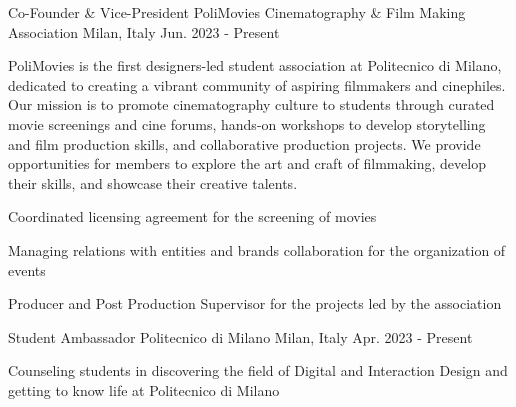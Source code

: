 

\begin{cventries}

  \cventry
    {Co-Founder \& Vice-President} %
    {PoliMovies Cinematography \& Film Making Association} %
    {Milan, Italy} %
    {Jun. 2023 - Present} %
    {
      \begin{cvitems} %
        {PoliMovies is the first designers-led student association at Politecnico di Milano, \\dedicated to creating a vibrant community of aspiring filmmakers and cinephiles. \\Our mission is to promote cinematography culture to students through curated movie screenings and cine forums, hands-on workshops to develop storytelling and film production skills, and collaborative production projects. We provide opportunities for members to explore the art and craft of filmmaking, develop their skills, and showcase their creative talents.}
        \item {}
        \item {Coordinated licensing agreement for the screening of movies}
        \item {Managing relations with entities and brands collaboration for the organization of events}
        \item {Producer and Post Production Supervisor for the projects led by the association}
      \end{cvitems}
    }

  \cventry
    {Student Ambassador} %
    {Politecnico di Milano} %
    {Milan, Italy} %
    {Apr. 2023 - Present} %
    {
      \begin{cvitems} %
        \item {Counseling students in discovering the field of Digital and Interaction Design and getting to know life at Politecnico di Milano}
      \end{cvitems}
    }


\end{cventries}
